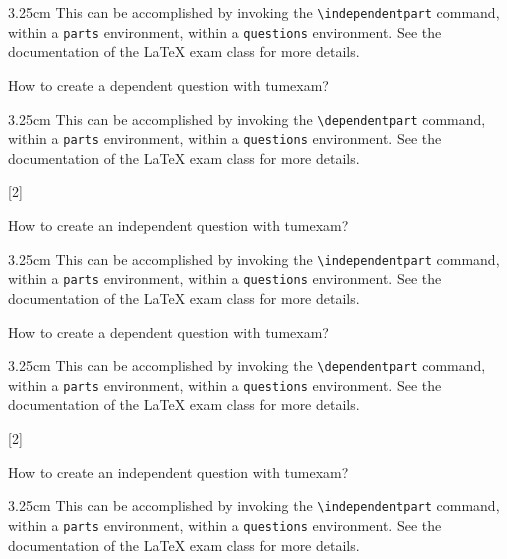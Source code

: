 \documentclass[english, @CLASSOPTIONS@]{tumexam}
\begin{document}
\begin{questions}
\begin{parts}
    \begin{solutionbox}{3.25cm}
      This can be accomplished by invoking the \texttt{\textbackslash{independentpart}} command, within a \texttt{parts} environment, within a \texttt{questions} environment. See the documentation of the \LaTeX{} exam class for more details.
    \end{solutionbox}
    \dependentpart
    How to create a dependent question with tumexam?
    \begin{solutionbox}{3.25cm}
      This can be accomplished by invoking the \texttt{\textbackslash{dependentpart}} command, within a \texttt{parts} environment, within a \texttt{questions} environment. See the documentation of the \LaTeX{} exam class for more details.
    \end{solutionbox}
  \end{parts}
  \clearpage
  [2]
  \begin{parts}
    \independentpart
    How to create an independent question with tumexam?
    \begin{solutionbox}{3.25cm}
      This can be accomplished by invoking the \texttt{\textbackslash{independentpart}} command, within a \texttt{parts} environment, within a \texttt{questions} environment. See the documentation of the \LaTeX{} exam class for more details.
    \end{solutionbox}
    \dependentpart
    How to create a dependent question with tumexam?
    \begin{solutionbox}{3.25cm}
      This can be accomplished by invoking the \texttt{\textbackslash{dependentpart}} command, within a \texttt{parts} environment, within a \texttt{questions} environment. See the documentation of the \LaTeX{} exam class for more details.
    \end{solutionbox}
  \end{parts}
  \clearpage
  [2]
  \begin{parts}
    \independentpart
    How to create an independent question with tumexam?
    \begin{solutionbox}{3.25cm}
      This can be accomplished by invoking the \texttt{\textbackslash{independentpart}} command, within a \texttt{parts} environment, within a \texttt{questions} environment. See the documentation of the \LaTeX{} exam class for more details.

\end{solutionbox}
\end{parts}
\end{questions}
\end{document}
